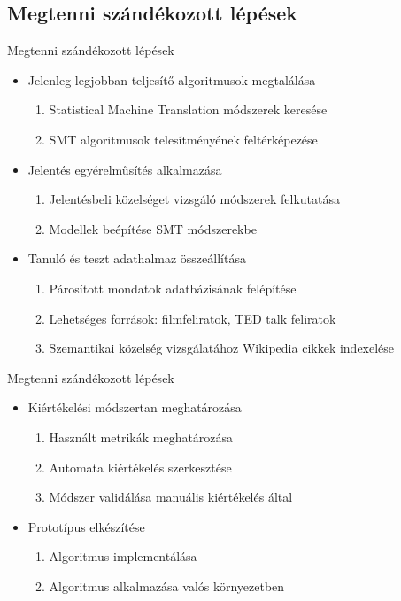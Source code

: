 \subsection{Megtenni szándékozott lépések}

\begin{frame}{Megtenni szándékozott lépések}
	\begin{itemize}
		\item Jelenleg legjobban teljesítő algoritmusok megtalálása
		\begin{enumerate}
			\item Statistical Machine Translation módszerek keresése
			\item SMT algoritmusok telesítményének feltérképezése
		\end{enumerate}
		
		\item Jelentés egyérelműsítés alkalmazása
		\begin{enumerate}
			\item Jelentésbeli közelséget vizsgáló módszerek felkutatása
			\item Modellek beépítése SMT módszerekbe
		\end{enumerate}
		
		\item Tanuló és teszt adathalmaz összeállítása
		\begin{enumerate}
			\item Párosított mondatok adatbázisának felépítése
			\item Lehetséges források: filmfeliratok, TED talk feliratok
			\item Szemantikai közelség vizsgálatához Wikipedia cikkek indexelése
		\end{enumerate}
		
	\end{itemize}
\end{frame}

\begin{frame}{Megtenni szándékozott lépések}
	\begin{itemize}
	\item Kiértékelési módszertan meghatározása
		\begin{enumerate}
			\item Használt metrikák meghatározása
			\item Automata kiértékelés szerkesztése
			\item Módszer validálása manuális kiértékelés által
		\end{enumerate}
		
		\item Prototípus elkészítése
		\begin{enumerate}
			\item Algoritmus implementálása
			\item Algoritmus alkalmazása valós környezetben
		\end{enumerate}
	\end{itemize}
\end{frame}